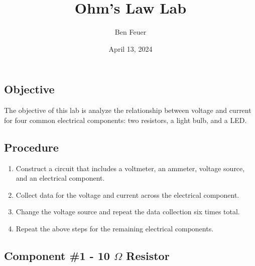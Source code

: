 \documentclass{report}
\title{\Huge{Ohm's Law Lab}}
\author{\huge{Ben Feuer}}
\date{April 13, 2024}
\begin{document}
\maketitle
\newpage%


\subsection*{Objective}
The objective of this lab is analyze the relationship between voltage and current for  four common electrical components: two resistors, a light bulb, and a LED.

\subsection*{Procedure}
\begin{enumerate}
    \item Construct a circuit that includes a voltmeter, an ammeter, voltage source, and an electrical component. 
    \item Collect data for the voltage and current across the electrical component. 
    \item Change the voltage source and repeat the data collection six times total. 
    \item Repeat the above steps for the remaining electrical components.
\end{enumerate}


\subsection*{Component \#1 - 10 $\Omega$ Resistor}

\begin{figure}[h]
\centering
{}%

\label{fig:my_label}
\end{figure}
\end{document}
